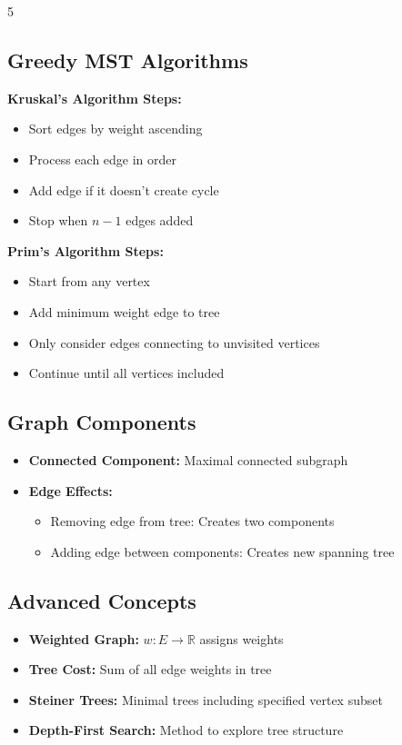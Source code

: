 \documentclass[a4paper,landscape]{article}
\begin{document}
\begin{multicols*}{5}
\subsection*{Greedy MST Algorithms}
\textbf{Kruskal's Algorithm Steps:}
\begin{itemize}[leftmargin=*, itemsep=0pt]
    \item Sort edges by weight ascending
    \item Process each edge in order
    \item Add edge if it doesn't create cycle
    \item Stop when $n-1$ edges added
\end{itemize}

\textbf{Prim's Algorithm Steps:}
\begin{itemize}[leftmargin=*, itemsep=0pt]
    \item Start from any vertex
    \item Add minimum weight edge to tree
    \item Only consider edges connecting to unvisited vertices
    \item Continue until all vertices included
\end{itemize}

\subsection*{Graph Components}
\begin{itemize}[leftmargin=*, itemsep=0pt]
    \item \textbf{Connected Component:} Maximal connected subgraph
    \item \textbf{Edge Effects:}
    \begin{itemize}[leftmargin=*, itemsep=0pt]
        \item Removing edge from tree: Creates two components
        \item Adding edge between components: Creates new spanning tree
    \end{itemize}
\end{itemize}

\subsection*{Advanced Concepts}
\begin{itemize}[leftmargin=*, itemsep=0pt]
    \item \textbf{Weighted Graph:} $w: E \rightarrow \mathbb{R}$ assigns weights
    \item \textbf{Tree Cost:} Sum of all edge weights in tree
    \item \textbf{Steiner Trees:} Minimal trees including specified vertex subset
    \item \textbf{Depth-First Search:} Method to explore tree structure
\end{itemize}

\end{multicols*}
\end{document}
